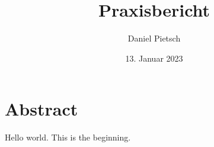 \documentclass[a4paper, 11pt]{article}
\title{Praxisbericht}
\author{Daniel Pietsch}
\date{13. Januar 2023}
\begin{document}
\section{Abstract}

Hello world. This is the beginning.
\end{document}
